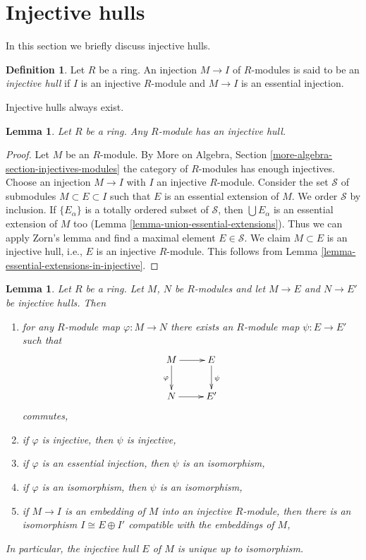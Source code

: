 \documentclass{stacks-project}
\theoremstyle{plain}
\newtheorem{lemma}[subsection]{Lemma}
\theoremstyle{definition}
\newtheorem{definition}[subsection]{Definition}
\theoremstyle{remark}
\numberwithin{equation}{subsection}
\begin{document}
\section{Injective hulls}
\label{section-injective-hull}

\noindent
In this section we briefly discuss injective hulls.

\begin{definition}
\label{definition-injective-hull}
Let $R$ be a ring. An injection $M \to I$ of $R$-modules is said
to be an {\it injective hull} if $I$ is an injective $R$-module and
$M \to I$ is an essential injection.
\end{definition}

\noindent
Injective hulls always exist.

\begin{lemma}
\label{lemma-injective-hull}
Let $R$ be a ring. Any $R$-module has an injective hull.
\end{lemma}

\begin{proof}
Let $M$ be an $R$-module. By
More on Algebra, Section \ref{more-algebra-section-injectives-modules}
the category of $R$-modules has enough injectives.
Choose an injection $M \to I$ with $I$ an injective $R$-module.
Consider the set $\mathcal{S}$ of submodules $M \subset E \subset I$
such that $E$ is an essential extension of $M$. We order $\mathcal{S}$
by inclusion. If $\{E_\alpha\}$ is a totally ordered subset
of $\mathcal{S}$, then $\bigcup E_\alpha$ is an essential extension of $M$
too (Lemma \ref{lemma-union-essential-extensions}).
Thus we can apply Zorn's lemma and find a maximal element
$E \in \mathcal{S}$. We claim $M \subset E$ is an injective hull, i.e.,
$E$ is an injective $R$-module. This follows from
Lemma \ref{lemma-essential-extensions-in-injective}.
\end{proof}

\begin{lemma}
\label{lemma-injective-hull-unique}
Let $R$ be a ring. Let $M$, $N$ be $R$-modules and let $M \to E$
and $N \to E'$ be injective hulls. Then
\begin{enumerate}
\item for any $R$-module map $\varphi : M \to N$ there exists an
$R$-module map $\psi : E \to E'$ such that
$$
\xymatrix{
M \ar[r] \ar[d]_\varphi & E \ar[d]^\psi \\
N \ar[r] & E'
}
$$
commutes,
\item if $\varphi$ is injective, then $\psi$ is injective,
\item if $\varphi$ is an essential injection, then $\psi$ is an isomorphism,
\item if $\varphi$ is an isomorphism, then $\psi$ is an isomorphism,
\item if $M \to I$ is an embedding of $M$ into an injective $R$-module,
then there is an isomorphism $I \cong E \oplus I'$ compatible with
the embeddings of $M$,
\end{enumerate}
In particular, the injective hull $E$ of $M$ is unique up to isomorphism.
\end{lemma}
\end{document}
